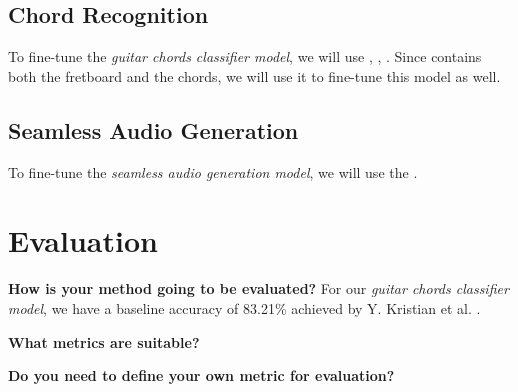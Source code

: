 \documentclass[10pt,twocolumn,letterpaper]{article}
\begin{document}
\subsection{Chord Recognition}
To fine-tune the \emph{guitar chords classifier model}, we will use \cite{guitar-chord-tvon8_dataset}, \cite{guitar-chord-bounding-box_dataset}, \cite{guitar-chord-handshape_dataset}. Since \cite{guitar-chords-daewp_dataset} contains both the fretboard and the chords, we will use it to fine-tune this model as well.

\subsection{Seamless Audio Generation}
To fine-tune the \emph{seamless audio generation model}, we will use the \cite{Xi2018}.

\section{Evaluation}

\textbf{How is your method going to be evaluated?}
For our \emph{guitar chords classifier model}, we have a baseline accuracy of 83.21\% achieved by Y. Kristian et al. \cite{Kristian_Zaman_Tenoyo_Jodhinata_2024}.

\textbf{What metrics are suitable?}

\textbf{Do you need to define your own metric for evaluation?}

{\small


}
\end{document}
